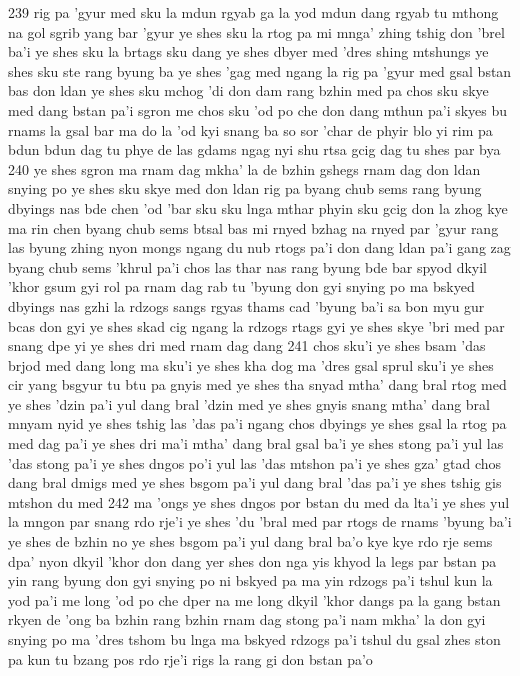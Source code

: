 239
rig pa 'gyur med sku la mdun rgyab ga la yod
mdun dang rgyab tu mthong na gol sgrib yang bar 'gyur
ye shes sku la rtog pa mi mnga' zhing
tshig don 'brel ba'i ye shes sku la brtags
sku dang ye shes dbyer med 'dres shing mtshungs
ye shes sku ste rang byung ba
ye shes 'gag med ngang la rig pa 'gyur med gsal
bstan bas don ldan ye shes sku mchog 'di
don dam rang bzhin med pa chos sku skye med dang
bstan pa'i sgron me chos sku 'od po che
don dang mthun pa'i skyes bu rnams la gsal
bar ma do la 'od kyi snang ba so sor 'char
de phyir blo yi rim pa bdun bdun dag tu phye
de las gdams ngag nyi shu rtsa gcig dag tu shes par bya
240
ye shes sgron ma rnam dag mkha' la de bzhin gshegs
rnam dag don ldan snying po ye shes sku
skye med don ldan rig pa byang chub sems
rang byung dbyings nas bde chen 'od 'bar sku
sku lnga mthar phyin sku gcig don la zhog
kye ma rin chen byang chub sems
btsal bas mi rnyed bzhag na rnyed par 'gyur
rang las byung zhing nyon mongs ngang du nub
rtogs pa'i don dang ldan pa'i gang zag byang chub sems
'khrul pa'i chos las thar nas rang byung bde bar spyod
dkyil 'khor gsum gyi rol pa rnam dag rab tu 'byung
don gyi snying po ma bskyed dbyings nas gzhi la rdzogs
sangs rgyas thams cad 'byung ba'i sa bon myu gur bcas
don gyi ye shes skad cig ngang la rdzogs
rtags gyi ye shes skye 'bri med par snang
dpe yi ye shes dri med rnam dag dang
241
chos sku'i ye shes bsam 'das brjod med dang
long ma sku'i ye shes kha dog ma 'dres gsal
sprul sku'i ye shes cir yang bsgyur tu btu pa
gnyis med ye shes tha snyad mtha' dang bral
rtog med ye shes 'dzin pa'i yul dang bral
'dzin med ye shes gnyis snang mtha' dang bral
mnyam nyid ye shes tshig las 'das pa'i ngang
chos dbyings ye shes gsal la rtog pa med
dag pa'i ye shes dri ma'i mtha' dang bral
gsal ba'i ye shes stong pa'i yul las 'das
stong pa'i ye shes dngos po'i yul las 'das
mtshon pa'i ye shes gza' gtad chos dang bral
dmigs med ye shes bsgom pa'i yul dang bral
'das pa'i ye shes tshig gis mtshon du med
242
ma 'ongs ye shes dngos por bstan du med
da lta'i ye shes yul la mngon par snang
rdo rje'i ye shes 'du 'bral med par rtogs
de rnams 'byung ba'i ye shes de bzhin no
ye shes bsgom pa'i yul dang bral ba'o
kye kye rdo rje sems dpa' nyon
dkyil 'khor don dang yer shes don
nga yis khyod la legs par bstan pa yin
rang byung don gyi snying po ni
bskyed pa ma yin rdzogs pa'i tshul
kun la yod pa'i me long 'od po che
dper na me long dkyil 'khor dangs pa la
gang bstan rkyen de 'ong ba bzhin
rang bzhin rnam dag stong pa'i nam mkha' la
don gyi snying po ma 'dres tshom bu lnga
ma bskyed rdzogs pa'i tshul du gsal
zhes ston pa kun tu bzang pos rdo rje'i rigs la rang gi don bstan pa'o
